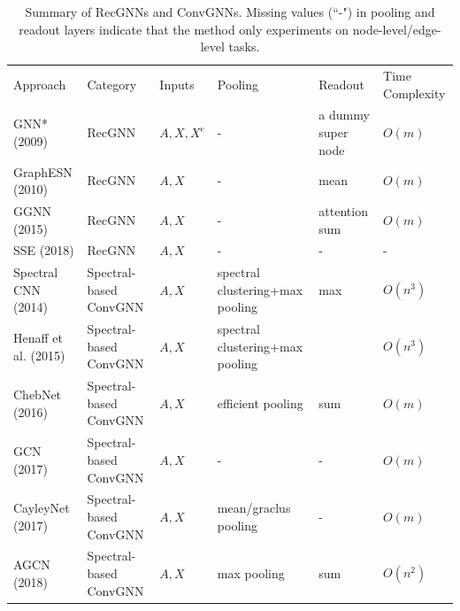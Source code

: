     \begin{table}[]
    	\caption{Summary of RecGNNs and ConvGNNs. %
    	Missing values (``-") in pooling and readout layers indicate that the method only experiments on node-level/edge-level tasks. 
    	}
		\label{tab:summary_gcn}
		\centering
        \begin{tabular}{l l l l l l }
        \toprule
        \multirow{2}{*}{Approach} & \multirow{2}{*}{Category} & \multirow{2}{*}{Inputs}  & \multirow{2}{*}{Pooling}  & \multirow{2}{*}{Readout} & \multirow{2}{*}{Time Complexity} \\ 
        &&&&& \\ \midrule
        GNN* (2009) \cite{scarselli2009graph}& RecGNN & $A,X,X^e$ & - &  a dummy super node          & $O(m)$ \\ \midrule
        GraphESN (2010) \cite{gallicchio2010graph} & RecGNN & $A,X$ & - & mean & $O(m)$\\ \midrule
        GGNN (2015) \cite{li2015gated} & RecGNN & $A,X$ & - & attention sum & $O(m)$ \\ \midrule
        SSE (2018) \cite{dai2018learning} & RecGNN & $A,X$ & - & - & - \\ \midrule
        Spectral CNN (2014) \cite{bruna2013spectral}&  Spectral-based ConvGNN &  $A,X$   & spectral clustering+max pooling & max & $O(n^3)$ \\ \midrule
        Henaff et al. (2015) \cite{henaff2015deep} & Spectral-based ConvGNN&  $A,X$   & spectral clustering+max pooling &  & $O(n^3)$ \\ \midrule
        ChebNet (2016) \cite{defferrard2016convolutional} & Spectral-based ConvGNN & $A,X$ &  efficient pooling & sum & $O(m)$ \\ \midrule
        GCN (2017) \cite{kipf2017semi} & Spectral-based ConvGNN & $A,X$ & - & - & $O(m)$ \\ \midrule
        CayleyNet (2017) \cite{levie2017cayleynets}& Spectral-based ConvGNN & $A,X$ & mean/graclus pooling & - & $O(m)$\\ \midrule
        AGCN (2018) \cite{li2018adaptive} & Spectral-based ConvGNN &$A,X$ & max pooling & sum & $O(n^2)$ \\ \midrule

\end{tabular}
\end{table}
